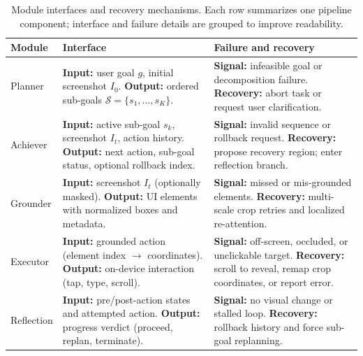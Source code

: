 \begin{table}[t]
  \centering
  \small
  \caption{Module interfaces and recovery mechanisms. Each row summarizes one pipeline component; interface and failure details are grouped to improve readability.}
  \label{tab:module_interfaces}
  \renewcommand{\arraystretch}{1.15}
  \setlength{\tabcolsep}{4pt}
  \begin{tabularx}{\textwidth}{@{}l
      >{\raggedright\arraybackslash}X
      >{\raggedright\arraybackslash}X@{}}
    \toprule
    \textbf{Module} & \textbf{Interface} & \textbf{Failure and recovery} \\
    \midrule
    Planner &
    \textbf{Input:} user goal $g$, initial screenshot $I_0$. \newline
    \textbf{Output:} ordered sub-goals $\mathcal{S}=\{s_1,\dots,s_K\}$. &
    \textbf{Signal:} infeasible goal or decomposition failure. \newline
    \textbf{Recovery:} abort task or request user clarification. \\
    \addlinespace
    Achiever &
    \textbf{Input:} active sub-goal $s_k$, screenshot $I_t$, action history. \newline
    \textbf{Output:} next action, sub-goal status, optional rollback index. &
    \textbf{Signal:} invalid sequence or rollback request. \newline
    \textbf{Recovery:} propose recovery region; enter reflection branch. \\
    \addlinespace
    Grounder &
    \textbf{Input:} screenshot $I_t$ (optionally masked). \newline
    \textbf{Output:} UI elements with normalized boxes and metadata. &
    \textbf{Signal:} missed or mis-grounded elements. \newline
    \textbf{Recovery:} multi-scale crop retries and localized re-attention. \\
    \addlinespace
    Executor &
    \textbf{Input:} grounded action (element index $\rightarrow$ coordinates). \newline
    \textbf{Output:} on-device interaction (tap, type, scroll). &
    \textbf{Signal:} off-screen, occluded, or unclickable target. \newline
    \textbf{Recovery:} scroll to reveal, remap crop coordinates, or report error. \\
    \addlinespace
    Reflection &
    \textbf{Input:} pre/post-action states and attempted action. \newline
    \textbf{Output:} progress verdict (proceed, replan, terminate). &
    \textbf{Signal:} no visual change or stalled loop. \newline
    \textbf{Recovery:} rollback history and force sub-goal replanning. \\
    \bottomrule
  \end{tabularx}
\end{table}


